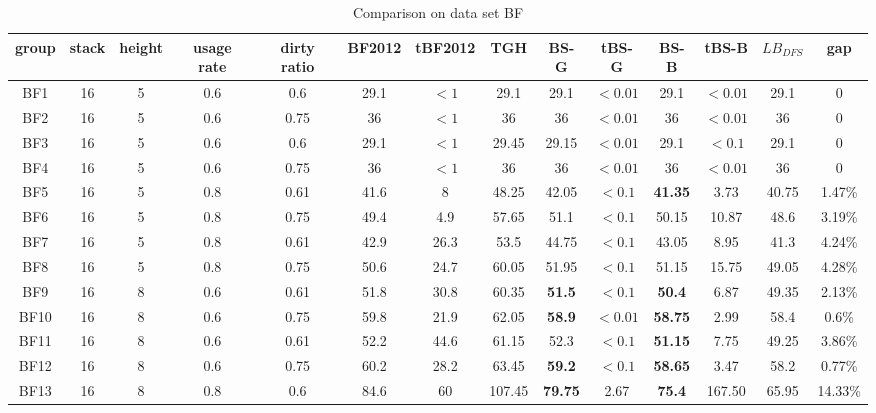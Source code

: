 \documentclass[review,3p,times,authoryear,12pt]{elsarticle}
\begin{document}
\begin{table}[!htb]
\caption{\label{tab:bf} Comparison on data set BF}
\scriptsize
\centering
\begin{tabular}{c|c|c|c|c|c|c|c|c|c|c|c|c|c}
  \hline
  group & stack & height & usage rate & dirty ratio & BF2012 & tBF2012 & TGH   & BS-G  & tBS-G & BS-B  & tBS-B & $\mathit{LB}_\mathit{DFS}$ & gap\\
    \hline
    BF1   & 16 & 5  & 0.6 & 0.6  & 29.1  & $<1$  & 29.1   & 29.1          & $<0.01$ & 29.1           & $<0.01$ & 29.1  & 0\\
    BF2   & 16 & 5  & 0.6 & 0.75 & 36    & $<1$  & 36     & 36            & $<0.01$ & 36             & $<0.01$ & 36    & 0\\
    BF3   & 16 & 5  & 0.6 & 0.6  & 29.1  & $<1$  & 29.45  & 29.15         & $<0.01$ & 29.1           & $<0.1$  & 29.1  & 0\\
    BF4   & 16 & 5  & 0.6 & 0.75 & 36    & $<1$  & 36     & 36            & $<0.01$ & 36             & $<0.01$ & 36    & 0\\
    BF5   & 16 & 5  & 0.8 & 0.61 & 41.6  & 8     & 48.25  & 42.05         & $<0.1$  & \textbf{41.35} & 3.73    & 40.75 & 1.47\%\\
    BF6   & 16 & 5  & 0.8 & 0.75 & 49.4  & 4.9   & 57.65  & 51.1          & $<0.1$  & 50.15          & 10.87   & 48.6  & 3.19\%\\
    BF7   & 16 & 5  & 0.8 & 0.61 & 42.9  & 26.3  & 53.5   & 44.75         & $<0.1$  & 43.05          & 8.95    & 41.3  & 4.24\%\\
    BF8   & 16 & 5  & 0.8 & 0.75 & 50.6  & 24.7  & 60.05  & 51.95         & $<0.1$  & 51.15          & 15.75   & 49.05 & 4.28\%\\
    BF9   & 16 & 8  & 0.6 & 0.61 & 51.8  & 30.8  & 60.35  & \textbf{51.5} & $<0.1$  & \textbf{50.4}  & 6.87    & 49.35 & 2.13\%\\
    BF10  & 16 & 8  & 0.6 & 0.75 & 59.8  & 21.9  & 62.05  & \textbf{58.9} & $<0.01$ & \textbf{58.75} & 2.99    & 58.4  & 0.6\%\\
    BF11  & 16 & 8  & 0.6 & 0.61 & 52.2  & 44.6  & 61.15  & 52.3          & $<0.1$  & \textbf{51.15} & 7.75    & 49.25 & 3.86\%\\
    BF12  & 16 & 8  & 0.6 & 0.75 & 60.2  & 28.2  & 63.45  & \textbf{59.2} & $<0.1$  & \textbf{58.65} & 3.47    & 58.2  & 0.77\%\\
    BF13  & 16 & 8  & 0.8 & 0.6  & 84.6  & 60    & 107.45 & \textbf{79.75}& 2.67    & \textbf{75.4}  & 167.50  & 65.95 & 14.33\%\\

\end{tabular}
\end{table}
\end{document}
